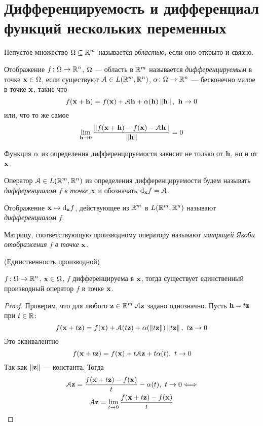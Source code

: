 \section{Дифференцируемость и дифференциал функций нескольких переменных}

\begin{definition}
    Непустое множество $\Omega \subseteq \mathbb{R}^m$ называется \textit{областью},
    если оно открыто и связно.
\end{definition}

\begin{definition}
    Отображение $f \colon \Omega \to \mathbb{R}^n$, $\Omega$ --- область в $\mathbb{R}^m$ называется
    \textit{дифференцируемым} в точке $\mathbf{x} \in \Omega$, если существуют $\mathcal{A} \in
    L(\mathbb{R}^m , \mathbb{R}^n)$, $\alpha \colon \Omega \to \mathbb{R}^n$ --- бесконечно малое в точке $\mathbf{x}$,
    такие что
\[
    f(\mathbf{x} + \mathbf{h}) = f(\mathbf{x}) + \mathcal{A} \mathbf{h} + \alpha(\mathbf{h}) \left\lVert\mathbf{h}\right\rVert,~\mathbf{h} \to 0
\]
    или, что то же самое
\[
    \lim_{\mathbf{h} \to 0}{\frac{\left\lVert f(\mathbf{x} + \mathbf{h}) - f(\mathbf{x}) - \mathcal{A} \mathbf{h}\right\rVert}{\left\lVert\mathbf{h}\right\rVert}} = 0
\]
\end{definition}

\begin{remark}
    Функция $\alpha$ из определения дифференцируемости зависит не только от $\mathbf{h}$,
    но и от $\mathbf{x}$.
\end{remark}

\begin{definition}
    Оператор $\mathcal{A} \in L(\mathbb{R}^m, \mathbb{R}^n)$ из определения дифференцируемости будем
    называть \textit{дифференциалом} $f$ \textit{в точке} $\mathbf{x}$ и обозначать
    $\mathrm{d}_{\mathbf{x}}{f} = \mathcal{A}$.
\end{definition}

\begin{remark}
    Отображение $\mathbf{x} \mapsto \mathrm{d}_{\mathbf{x}}{f}$, действующее из $\mathbb{R}^m$ в $L(\mathbb{R}^m, \mathbb{R}^n)$
    называют \textit{дифференциалом} $f$.
\end{remark}

\begin{definition}
    Матрицу, соответствующую производному оператору называют \textit{матрицей
    Якоби отображения} $f$ \textit{в точке} $\mathbf{x}$.
\end{definition}

\begin{theorem}(Единственность производной)

    $f \colon \Omega \to \mathbb{R}^n$, $\mathbf{x} \in \Omega$, $f$ дифференцируема в $\mathbf{x}$, тогда
    существует единственный производный оператор $f$ в точке $\mathbf{x}$.
\end{theorem}
\begin{proof}
    Проверим, что для любого $\mathbf{z} \in \mathbb{R}^m~ \mathcal{A} \mathbf{z}$ задано однозначно.
     Пусть $\mathbf{h} = t\mathbf{z}$ при $t \in \mathbb{R}$:
\[
    f(\mathbf{x} + t \mathbf{z}) = f(\mathbf{x}) + \mathcal{A}(t \mathbf{z}) + \alpha(\left\lVert t\mathbf{z}\right\rVert) \left\lVert t\mathbf{z}\right\rVert,~ t\mathbf{z} \to 0
\]
    Это эквивалентно
\[
    f(\mathbf{x} + t \mathbf{z}) = f(\mathbf{x}) + t\mathcal{A} \mathbf{z} + t\alpha(t),~ t \to 0
\]
    Так как $\left\lVert\mathbf{z}\right\rVert$ --- константа. Тогда
\begin{gather*}
    \mathcal{A}\mathbf{z} = \frac{f(\mathbf{x} + t \mathbf{z}) - f(\mathbf{x})}{t} - \alpha(t),~ t \to 0 \Longleftrightarrow \\
    \mathcal{A}\mathbf{z} = \lim_{t \to 0}{\frac{f(\mathbf{x} + t \mathbf{z}) - f(\mathbf{x})}{t}}
\end{gather*}
\end{proof}

